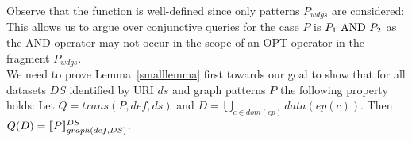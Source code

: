 \begin{enumerate}
\end{enumerate}
Observe that the function is well-defined since only patterns $P_{wdgs}$ are
considered: This allows us to argue over conjunctive queries for the case $P$ is $P_1
\mbox{ AND } P_2$ as the AND-operator may not occur in the scope of an OPT-operator in the fragment
$P_{wdgs}$. \\
We need to prove Lemma~\ref{smalllemma} first towards our goal to show that for 
all datasets $DS$ identified by URI $ds$ and graph patterns $P$ the following property holds: 
Let $Q = trans(P,def,ds)$ and $D=\bigcup\limits_{c \in dom(ep)} data(ep(c))$. Then $Q(D) = \llbracket P
\rrbracket^{DS}_{graph(def,DS)}$. 

